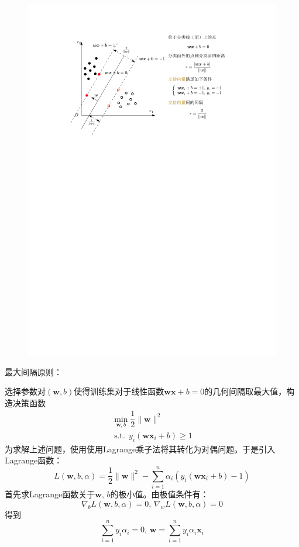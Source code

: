 \begin{figure}[htbp]
    \centering
    \includegraphics{image/支持向量机.pdf}
\end{figure}
\textcolor{main1}{最大间隔原则：}

选择参数对$(\boldsymbol{w},b)$使得训练集对于线性函数$\boldsymbol{wx}+b = 0$的几何间隔取最大值，构造决策函数
\[
    \begin{array}{l}
        \min\limits_{\boldsymbol{w},b} \dfrac{1}{2}\|\boldsymbol{w}\|^2\\
        \operatorname{s.t.}\, y_i\left( \boldsymbol{wx}_i+b \right)\geq 1
    \end{array}
\]
为求解上述问题，使用使用Lagrange乘子法将其转化为对偶问题。于是引入Lagrange函数：
\[
    L\left( \boldsymbol{w},b,\alpha \right) = \dfrac{1}{2}\|\boldsymbol{w}\|^2 - \sum\limits_{i = 1}^{n}\alpha_i\left( y_i\left( \boldsymbol{wx}_i+b \right)-1 \right)
\]
首先求Lagrange函数关于$\boldsymbol{w},\,b$的极小值。由极值条件有：
\[
    \nabla_{b}L\left( \boldsymbol{w},b,\alpha \right) = 0,\,\nabla_{w}L\left( \boldsymbol{w},b,\alpha \right) = 0
\]
得到
\[
    \sum\limits_{i = 1}^{n}y_{i}\alpha_i = 0,\,\boldsymbol{w} = \sum\limits_{i = 1}^{n}y_{i}\alpha_i\boldsymbol{x}_i
\]

